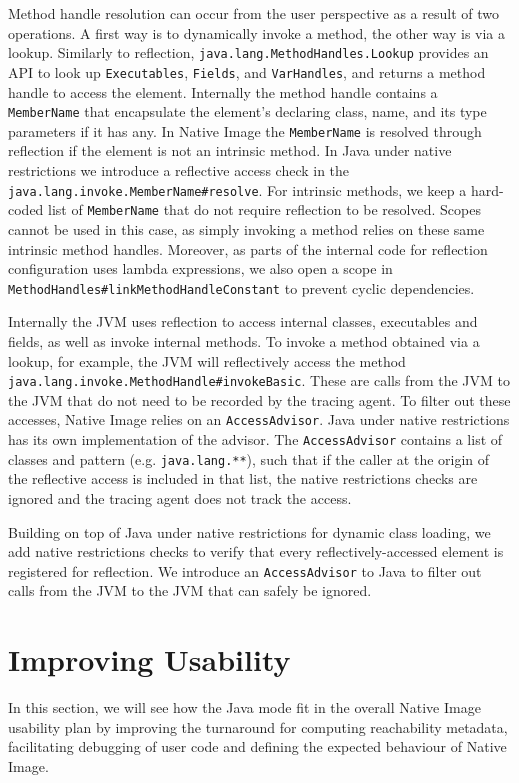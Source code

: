 Method handle resolution can occur from the user perspective as a result of two operations. A first way is to dynamically invoke a method, the other way is via a lookup.
Similarly to reflection, \verb|java.lang.MethodHandles.Lookup| provides an API to look up \verb|Executables|, \verb|Fields|, and \verb|VarHandles|, and returns a method handle to access the element. Internally the method handle contains a \verb|MemberName| that encapsulate the element's declaring class, name, and its type parameters if it has any. 
In Native Image the \verb|MemberName| is resolved through reflection if the element is not an intrinsic method. In Java under native restrictions we introduce a reflective access check in the \verb|java.lang.invoke.MemberName#resolve|. 
For intrinsic methods, we keep a hard-coded list of \verb|MemberName| that do not require reflection to be resolved. Scopes cannot be used in this case, as simply invoking a method relies on these same intrinsic method handles.
Moreover, as parts of the internal code for reflection configuration uses lambda expressions, we also open a scope in \verb|MethodHandles#linkMethodHandleConstant| to prevent cyclic dependencies.

Internally the JVM uses reflection to access internal classes, executables and fields, as well as invoke internal methods. To invoke a method obtained via a lookup, for example, the JVM will reflectively access the method \verb|java.lang.invoke.MethodHandle#invokeBasic|. These are calls from the JVM to the JVM that do not need to be recorded by the tracing agent. To filter out these accesses, Native Image relies on an \verb|AccessAdvisor|. Java under native restrictions has its own implementation of the advisor. The \verb|AccessAdvisor| contains a list of classes and pattern (e.g. \verb|java.lang.**|), such that if the caller at the origin of the reflective access is included in that list, the native restrictions checks are ignored and the tracing agent does not track the access.

Building on top of Java under native restrictions for dynamic class loading, we add native restrictions checks to verify that every reflectively-accessed element is registered for reflection. We introduce an \verb|AccessAdvisor| to Java to filter out calls from the JVM to the JVM that can safely be ignored.

\section{Improving Usability}
In this section, we will see how the Java mode fit in the overall Native Image usability plan by improving the turnaround for computing reachability metadata, facilitating debugging of user code and defining the expected behaviour of Native Image. 

